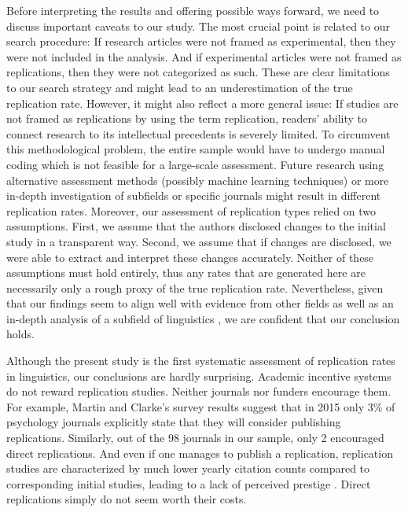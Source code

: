 \documentclass[cm,linguex]{glossa}
\begin{document}
Before interpreting the results and offering possible ways forward, we need to discuss important caveats to our study. The most crucial point is related to our search procedure: If research articles were not framed as experimental, then they were not included in the analysis. And if experimental articles were not framed as replications, then they were not categorized as such. These are clear limitations to our search strategy and might lead to an underestimation of the true replication rate. However, it might also reflect a more general issue: If studies are not framed as replications by using the term replication, readers' ability to connect research to its intellectual precedents is severely limited. To circumvent this methodological problem, the entire sample would have to undergo manual coding which is not feasible for a large-scale assessment. Future research using alternative assessment methods (possibly machine learning techniques) or more in-depth investigation of subfields \citep[e.g.,][]{marsden_replication_2018} or specific journals might result in different replication rates.
Moreover, our assessment of replication types relied on two assumptions. First, we assume that the authors disclosed changes to the initial study in a transparent way. Second, we assume that if changes are disclosed, we were able to extract and interpret these changes accurately. Neither of these assumptions must hold entirely, thus any rates that are generated here are necessarily only a rough proxy of the true replication rate. Nevertheless, given that our findings seem to align well with evidence from other fields as well as an in-depth analysis of a subfield of linguistics \citep{marsden_replication_2018}, we are confident that our conclusion holds.

Although the present study is the first systematic assessment of replication rates in linguistics, our conclusions are hardly surprising. Academic incentive systems do not reward replication studies. Neither journals nor funders encourage them. For example, Martin and Clarke's \citeyearpar{martin_are_2017} survey results suggest that in 2015 only 3\% of psychology journals explicitly state that they will consider publishing replications. Similarly, out of the 98 journals in our sample, only 2 encouraged direct replications. And even if one manages to publish a replication, replication studies are characterized by much lower yearly citation counts compared to corresponding initial studies, leading to a lack of perceived prestige \citep[e.g.,][]{koole_rewarding_2012, nosek_scientific_2012, marsden_replication_2018}. Direct replications simply do not seem worth their costs.
\end{document}
